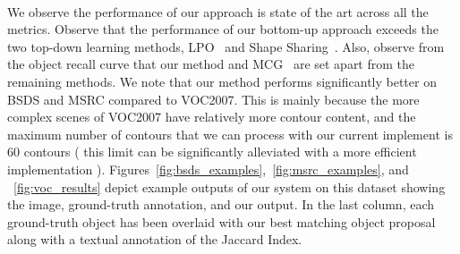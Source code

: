 \noindent\\

We observe the performance of our approach is state of the art across all the metrics. Observe that the performance of our bottom-up approach exceeds the two top-down learning methods, LPO~\cite{Krahenbuhl:Koltun:CVPR15}  and Shape Sharing~\cite{Kim:Grauman:ECCV12}. Also, observe from the object recall curve that our method and MCG~\cite{Arbelaez:etal:CVPR14} are set apart from the remaining methods. We note that our method performs significantly better on BSDS and MSRC compared to VOC2007. This is mainly because the more complex scenes of VOC2007 have relatively more contour content, and the maximum number of contours that we can process with our current implement is 60 contours ( this limit can be significantly alleviated with a more efficient implementation ).  Figures~\ref{fig:bsds_examples},~\ref{fig:msrc_examples}, and ~\ref{fig:voc_results} depict example outputs of our system on this dataset showing the image, ground-truth annotation, and our output. In the last column, each ground-truth object has been overlaid with our best matching object proposal along with a textual annotation of the Jaccard Index.




